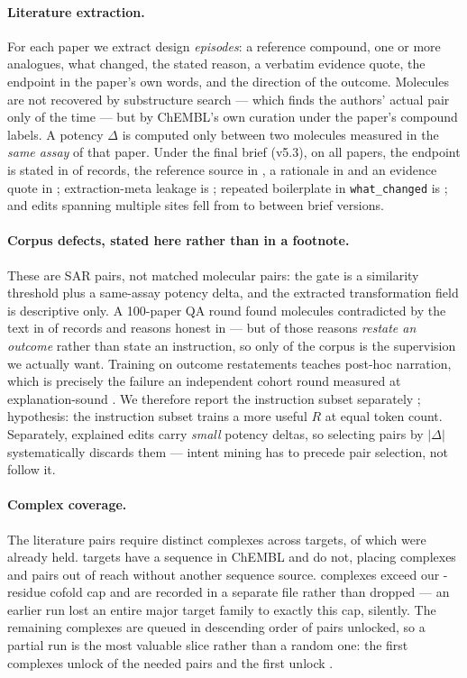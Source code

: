 \paragraph{Literature extraction.} For each paper we extract design \emph{episodes}: a reference
compound, one or more analogues, what changed, the stated reason, a verbatim evidence quote, the
endpoint in the paper's own words, and the direction of the outcome. Molecules are not recovered by
substructure search --- which finds the authors' actual pair only  of the time --- but by
ChEMBL's own curation under the paper's compound labels. A potency $\Delta$ is computed only between
two molecules measured in the \emph{same assay} of that paper. Under the final brief (v5.3), on all
 papers, the endpoint is stated in  of records, the reference source in
, a rationale in  and an evidence quote in ; extraction-meta leakage is
; repeated boilerplate in \texttt{what\_changed} is ; and edits spanning multiple
sites fell from  to  between brief versions.

\paragraph{Corpus defects, stated here rather than in a footnote.} These are SAR pairs, not matched
molecular pairs: the gate is a similarity threshold plus a same-assay potency delta, and the
extracted transformation field is descriptive only. A 100-paper QA round found molecules contradicted
by the text in  of records and reasons honest in  --- but  of those
reasons \emph{restate an outcome} rather than state an instruction, so only  of the corpus
is the supervision we actually want. Training on outcome restatements teaches post-hoc narration,
which is precisely the failure an independent cohort round measured at explanation-sound .
We therefore report the instruction subset separately ;
hypothesis: the instruction subset trains a more useful $R$ at equal token count. Separately,
explained edits carry \emph{small} potency deltas, so selecting pairs by $|\Delta|$ systematically
discards them --- intent mining has to precede pair selection, not follow it.

\paragraph{Complex coverage.} The  literature pairs require  distinct
complexes across  targets, of which  were already held.  targets have a
sequence in ChEMBL and  do not, placing  complexes and  pairs out of
reach without another sequence source.  complexes exceed our -residue cofold cap
and are recorded in a separate file rather than dropped --- an earlier run lost an entire major
target family to exactly this cap, silently. The remaining  complexes are queued in
descending order of pairs unlocked, so a partial run is the most valuable slice rather than a random
one: the first  complexes unlock  of the needed pairs and the first 
unlock .

